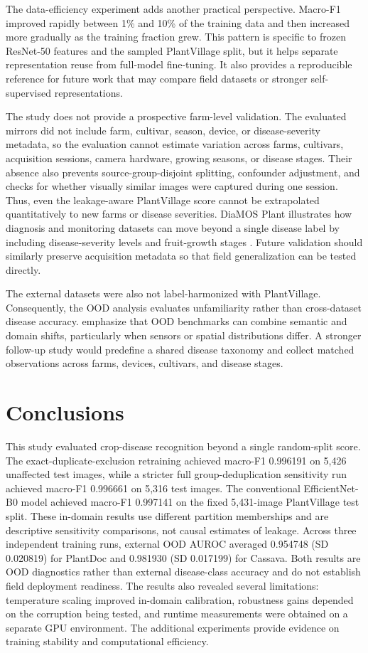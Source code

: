 \documentclass{sbc2023}%
\begin{document}
The data-efficiency experiment adds another practical perspective. Macro-F1 improved rapidly between 1\% and 10\% of the training data and then increased more gradually as the training fraction grew. This pattern is specific to frozen ResNet-50 features and the sampled PlantVillage split, but it helps separate representation reuse from full-model fine-tuning. It also provides a reproducible reference for future work that may compare field datasets or stronger self-supervised representations.



The study does not provide a prospective farm-level validation. The evaluated mirrors did not include farm, cultivar, season, device, or disease-severity metadata, so the evaluation cannot estimate variation across farms, cultivars, acquisition sessions, camera hardware, growing seasons, or disease stages. Their absence also prevents source-group-disjoint splitting, confounder adjustment, and checks for whether visually similar images were captured during one session. Thus, even the leakage-aware PlantVillage score cannot be extrapolated quantitatively to new farms or disease severities. DiaMOS Plant illustrates how diagnosis and monitoring datasets can move beyond a single disease label by including disease-severity levels and fruit-growth stages \cite{r41}. Future validation should similarly preserve acquisition metadata so that field generalization can be tested directly.

The external datasets were also not label-harmonized with PlantVillage. Consequently, the OOD analysis evaluates unfamiliarity rather than cross-dataset disease accuracy. \citet{r42} emphasize that OOD benchmarks can combine semantic and domain shifts, particularly when sensors or spatial distributions differ. A stronger follow-up study would predefine a shared disease taxonomy and collect matched observations across farms, devices, cultivars, and disease stages.
\section{Conclusions}\label{sec:conclusion}
This study evaluated crop-disease recognition beyond a single random-split score. The exact-duplicate-exclusion retraining achieved macro-F1 0.996191 on 5,426 unaffected test images, while a stricter full group-deduplication sensitivity run achieved macro-F1 0.996661 on 5,316 test images. The conventional EfficientNet-B0 model achieved macro-F1 0.997141 on the fixed 5,431-image PlantVillage test split. These in-domain results use different partition memberships and are descriptive sensitivity comparisons, not causal estimates of leakage. Across three independent training runs, external OOD AUROC averaged 0.954748 (SD 0.020819) for PlantDoc and 0.981930 (SD 0.017199) for Cassava. Both results are OOD diagnostics rather than external disease-class accuracy and do not establish field deployment readiness. The results also revealed several limitations: temperature scaling improved in-domain calibration, robustness gains depended on the corruption being tested, and runtime measurements were obtained on a separate GPU environment. The additional experiments provide evidence on training stability and computational efficiency.
\end{document}
